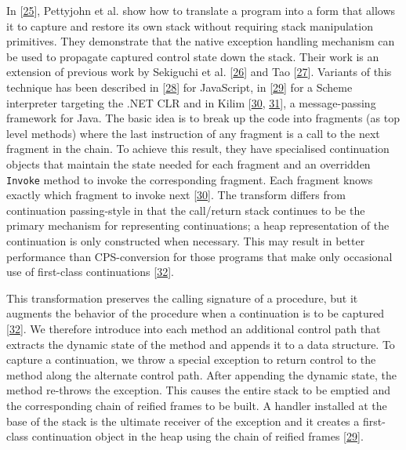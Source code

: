 \documentclass[12pt,a4paper,oneside,openright]{book}
\begin{document}
In {[}\hyperref[ref-Pettyjohn2005]{25}{]}, Pettyjohn et al. show how to
translate a program into a form that allows it to capture and restore
its own stack without requiring stack manipulation primitives. They
demonstrate that the native exception handling mechanism can be used to
propagate captured control state down the stack. Their work is an
extension of previous work by Sekiguchi et al.
{[}\hyperref[ref-Sekiguchi2001]{26}{]} and Tao
{[}\hyperref[ref-tao2001portable]{27}{]}. Variants of this technique has
been described in {[}\hyperref[ref-Loitsch2007]{28}{]} for JavaScript,
in {[}\hyperref[ref-Marshall2009]{29}{]} for a Scheme interpreter
targeting the .NET CLR and in Kilim
{[}\hyperref[ref-Srinivasan2006]{30}, \hyperref[ref-Bolton2000]{31}{]},
a message-passing framework for Java. The basic idea is to break up the
code into fragments (as top level methods) where the last instruction of
any fragment is a call to the next fragment in the chain. To achieve
this result, they have specialised continuation objects that maintain
the state needed for each fragment and an overridden \texttt{Invoke}
method to invoke the corresponding fragment. Each fragment knows exactly
which fragment to invoke next {[}\hyperref[ref-Srinivasan2006]{30}{]}.
The transform differs from continuation passing-style in that the
call/return stack continues to be the primary mechanism for representing
continuations; a heap representation of the continuation is only
constructed when necessary. This may result in better performance than
CPS-conversion for those programs that make only occasional use of
first-class continuations {[}\hyperref[ref-StackHack2005]{32}{]}.

This transformation preserves the calling signature of a procedure, but
it augments the behavior of the procedure when a continuation is to be
captured {[}\hyperref[ref-StackHack2005]{32}{]}. We therefore introduce
into each method an additional control path that extracts the dynamic
state of the method and appends it to a data structure. To capture a
continuation, we throw a special exception to return control to the
method along the alternate control path. After appending the dynamic
state, the method re-throws the exception. This causes the entire stack
to be emptied and the corresponding chain of reified frames to be built.
A handler installed at the base of the stack is the ultimate receiver of
the exception and it creates a first-class continuation object in the
heap using the chain of reified frames
{[}\hyperref[ref-Marshall2009]{29}{]}.
\end{document}
